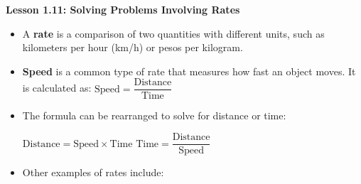 \begin{center}
\textbf{Lesson 1.11: Solving Problems Involving Rates}
\end{center}

\vspace*{-1.5ex}

\begin{itemize}
    \item A \textbf{rate} is a comparison of two quantities with different units, such as kilometers per hour (km/h) or pesos per kilogram.
    \item \textbf{Speed} is a common type of rate that measures how fast an object moves. It is calculated as: \hfil $    \text{Speed} = \dfrac{\text{Distance}}{\text{Time}} $ \hfil\par


    \item The formula can be rearranged to solve for distance or time:

{\centering $    \text{Distance} = \text{Speed} \times \text{Time} $ \quad \quad $    \text{Time} = \dfrac{\text{Distance}}{\text{Speed}} $\par}


    \item Other examples of rates include:
      \begin{itemize}
    \end{itemize}
\end{itemize}
